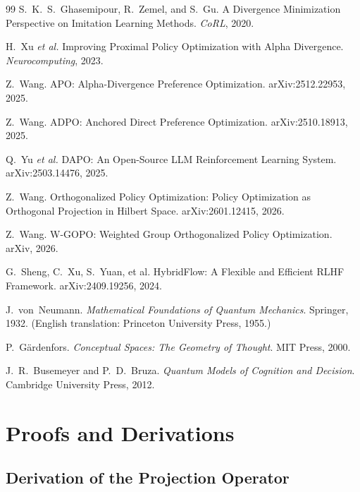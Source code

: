 \documentclass[11pt]{article}
\theoremstyle{definition}
\theoremstyle{remark}
\begin{document}
\begin{thebibliography}{99}
S.~K.~S.~Ghasemipour, R.~Zemel, and S.~Gu.
A Divergence Minimization Perspective on Imitation Learning Methods.
\emph{CoRL}, 2020.

H.~Xu \emph{et al.}
Improving Proximal Policy Optimization with Alpha Divergence.
\emph{Neurocomputing}, 2023.

Z.~Wang.
APO: Alpha-Divergence Preference Optimization.
arXiv:2512.22953, 2025.

Z.~Wang.
ADPO: Anchored Direct Preference Optimization.
arXiv:2510.18913, 2025.

Q.~Yu \emph{et al.}
DAPO: An Open-Source LLM Reinforcement Learning System.
arXiv:2503.14476, 2025.

Z.~Wang.
Orthogonalized Policy Optimization: Policy Optimization as Orthogonal Projection in Hilbert Space.
arXiv:2601.12415, 2026.

Z.~Wang.
W-GOPO: Weighted Group Orthogonalized Policy Optimization.
arXiv, 2026.

G.~Sheng, C.~Xu, S.~Yuan, et al.
HybridFlow: A Flexible and Efficient RLHF Framework.
arXiv:2409.19256, 2024.

J.~von~Neumann.
\emph{Mathematical Foundations of Quantum Mechanics}.
Springer, 1932. (English translation: Princeton University Press, 1955.)

P.~G\"ardenfors.
\emph{Conceptual Spaces: The Geometry of Thought}.
MIT Press, 2000.

J.~R.~Busemeyer and P.~D.~Bruza.
\emph{Quantum Models of Cognition and Decision}.
Cambridge University Press, 2012.

\end{thebibliography}

\appendix
\section{Proofs and Derivations}
\label{app:proofs}

\subsection{Derivation of the Projection Operator}
\label{app:projection}
\end{document}

